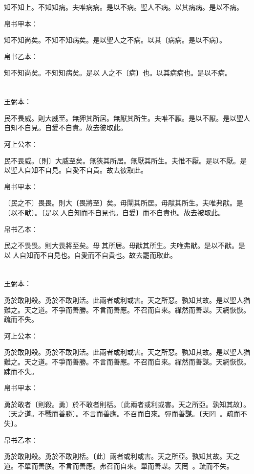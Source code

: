\documentclass[a5paper]{ctexbook}
\begin{document}
    知不知上。不知知病。夫唯病病。是以不病。聖人不病。以其病病。是以不病。

    帛书甲本：

    知不知尚矣。不知不知病矣。是以聖人之不病。以其〔病病。是以不病〕。

    帛书乙本：

    知不知尚矣。不知知病矣。是以𦔻人之不〔病〕也。以其病病也。是以不病。

    \chapter{}
    王弼本：

    民不畏威。則大威至。無狎其所居。無厭其所生。夫唯不厭。是以不厭。是以聖人自知不自見。自愛不自貴。故去彼取此。

    河上公本：

    民不畏威。〔則〕大威至矣。無狹其所居。無厭其所生。夫惟不厭。是以不厭。是以聖人自知不自見。自愛不自貴。故去彼取此。

    帛书甲本：

    〔民之不〕畏畏。則大〔畏將至〕矣。毋閘其所居。毋猒其所生。夫唯弗猒。是〔以不猒〕。〔是以𦔻人自知而不自見也。自愛〕而不自貴也。故去被取此。

    帛书乙本：

    民之不畏畏。則大畏將至矣。毋𠇺其所居。毋猒其所生。夫唯弗猒。是以不猒。是以𦔻人自知而不自見也。自愛而不自貴也。故去罷而取此。

    \chapter{}
    王弼本：

    勇於敢則殺。勇於不敢則活。此兩者或利或害。天之所惡。孰知其故。是以聖人猶難之。天之道。不爭而善勝。不言而善應。不召而自來。繟然而善謀。天網恢恢。疏而不失。

    河上公本：

    勇於敢則殺。勇於不敢則活。此兩者或利或害。天之所惡。孰知其故。是以聖人猶難之。天之道。不爭而善勝。不言而善應。不召而自來。繟然而善謀。天網恢恢。踈而不失。

    帛书甲本：

    勇於敢者〔則殺。勇〕於不敢者則栝。〔此兩者或利或害。天之所亞。孰知其故〕。〔天之道。不戰而善勝〕。不言而善應。不召而自來。彈而善謀。〔天罔𧙔𧙔。疏而不失〕。

    帛书乙本：

    勇於敢則殺。勇於不敢則栝。〔此〕兩者或利或害。天之所亞。孰知其故。天之道。不單而善朕。不言而善應。弗召而自來。單而善謀。天罔𧙔𧙔。疏而不失。
\end{document}
